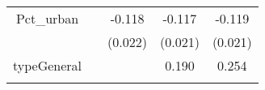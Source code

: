 \documentclass[12pt,twoside]{reedthesis}
\begin{document}
\begin{longtable}[]{@{}ccccc@{}}
  \begin{minipage}[t]{0.26\columnwidth}\centering\strut
  Pct\_urban\strut
  \end{minipage} & \begin{minipage}[t]{0.12\columnwidth}\centering\strut
  \strut
  \end{minipage} & \begin{minipage}[t]{0.12\columnwidth}\centering\strut
  -0.118\strut
  \end{minipage} & \begin{minipage}[t]{0.12\columnwidth}\centering\strut
  -0.117\strut
  \end{minipage} & \begin{minipage}[t]{0.12\columnwidth}\centering\strut
  -0.119\strut
  \end{minipage}\tabularnewline
  \begin{minipage}[t]{0.26\columnwidth}\centering\strut
  \strut
  \end{minipage} & \begin{minipage}[t]{0.12\columnwidth}\centering\strut
  \strut
  \end{minipage} & \begin{minipage}[t]{0.12\columnwidth}\centering\strut
  (0.022)\strut
  \end{minipage} & \begin{minipage}[t]{0.12\columnwidth}\centering\strut
  (0.021)\strut
  \end{minipage} & \begin{minipage}[t]{0.12\columnwidth}\centering\strut
  (0.021)\strut
  \end{minipage}\tabularnewline
  \begin{minipage}[t]{0.26\columnwidth}\centering\strut
  typeGeneral\strut
  \end{minipage} & \begin{minipage}[t]{0.12\columnwidth}\centering\strut
  \strut
  \end{minipage} & \begin{minipage}[t]{0.12\columnwidth}\centering\strut
  \strut
  \end{minipage} & \begin{minipage}[t]{0.12\columnwidth}\centering\strut
  0.190\strut
  \end{minipage} & \begin{minipage}[t]{0.12\columnwidth}\centering\strut
  0.254\strut
  \end{minipage}\tabularnewline
  \begin{minipage}[t]{0.26\columnwidth}\centering\strut

\end{minipage}
\end{longtable}
\end{document}
